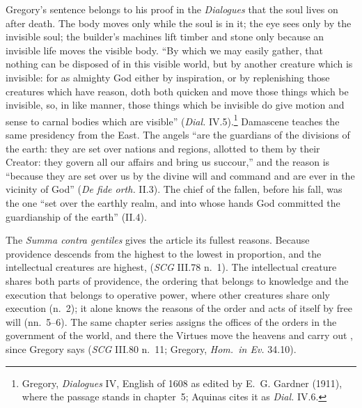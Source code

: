 Gregory's sentence belongs to his proof in the \emph{Dialogues} that the
soul lives on after death. The body moves only while the soul is in it;
the eye sees only by the invisible soul; the builder's machines lift
timber and stone only because an invisible life moves the visible body.
``By which we may easily gather, that nothing can be disposed of in this
visible world, but by another creature which is invisible: for as almighty
God either by inspiration, or by replenishing those creatures which have
reason, doth both quicken and move those things which be invisible, so, in
like manner, those things which be invisible do give motion and sense to
carnal bodies which are visible'' (\emph{Dial.} IV.5).\footnote{Gregory,
\emph{Dialogues} IV, English of 1608 as edited by E.~G. Gardner (1911),
where the passage stands in chapter~5; Aquinas cites it as \emph{Dial.}
IV.6.} Damascene teaches the same presidency from the East. The angels ``are
the guardians of the divisions of the earth: they are set over nations and
regions, allotted to them by their Creator: they govern all our affairs and
bring us succour,'' and the reason is ``because they are set over us by the
divine will and command and are ever in the vicinity of God'' (\emph{De
fide orth.} II.3). The chief of the fallen, before his fall, was the one
``set over the earthly realm, and into whose hands God committed the
guardianship of the earth'' (II.4).

The \emph{Summa contra gentiles} gives the article its fullest reasons.
Because providence descends from the highest to the lowest in proportion,
and the intellectual creatures are highest, 
(\emph{SCG} III.78 n.~1). The intellectual creature shares both parts of
providence, the ordering that belongs to knowledge and the execution that
belongs to operative power, where other creatures share only execution
(n.~2); it alone knows the reasons of the order and acts of itself by free
will (nn.~5--6). The same chapter series assigns the offices of the orders
in the government of the world, and there the Virtues move the heavens and
carry out ,
since Gregory says  (\emph{SCG} III.80 n.~11; Gregory, \emph{Hom.\ in Ev.}
34.10).


